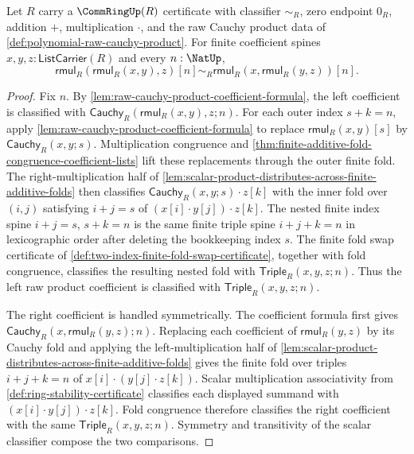 \begin{lemma}
\label{lem:raw-cauchy-product-coefficient-associativity}
Let $R$ carry a $\CommRingUp(R)$ certificate with classifier $\sim_R$, zero endpoint $0_R$, addition $+$, multiplication $\cdot$, and the raw Cauchy product data of \autoref{def:polynomial-raw-cauchy-product}. For finite coefficient spines $x,y,z:\mathsf{ListCarrier}(R)$ and every $n:\NatUp$,
$$
\mathsf{rmul}_R(\mathsf{rmul}_R(x,y),z)[n]\sim_R\mathsf{rmul}_R(x,\mathsf{rmul}_R(y,z))[n].
$$
\end{lemma}
\begin{proof}
Fix $n$. By \autoref{lem:raw-cauchy-product-coefficient-formula}, the left coefficient is classified with $\mathsf{Cauchy}_R(\mathsf{rmul}_R(x,y),z;n)$. For each outer index $s+k=n$, apply \autoref{lem:raw-cauchy-product-coefficient-formula} to replace $\mathsf{rmul}_R(x,y)[s]$ by $\mathsf{Cauchy}_R(x,y;s)$. Multiplication congruence and \autoref{thm:finite-additive-fold-congruence-coefficient-lists} lift these replacements through the outer finite fold. The right-multiplication half of \autoref{lem:scalar-product-distributes-across-finite-additive-folds} then classifies $\mathsf{Cauchy}_R(x,y;s)\cdot z[k]$ with the inner fold over $(i,j)$ satisfying $i+j=s$ of $(x[i]\cdot y[j])\cdot z[k]$. The nested finite index spine $i+j=s$, $s+k=n$ is the same finite triple spine $i+j+k=n$ in lexicographic order after deleting the bookkeeping index $s$. The finite fold swap certificate of \autoref{def:two-index-finite-fold-swap-certificate}, together with fold congruence, classifies the resulting nested fold with $\mathsf{Triple}_R(x,y,z;n)$. Thus the left raw product coefficient is classified with $\mathsf{Triple}_R(x,y,z;n)$.

The right coefficient is handled symmetrically. The coefficient formula first gives $\mathsf{Cauchy}_R(x,\mathsf{rmul}_R(y,z);n)$. Replacing each coefficient of $\mathsf{rmul}_R(y,z)$ by its Cauchy fold and applying the left-multiplication half of \autoref{lem:scalar-product-distributes-across-finite-additive-folds} gives the finite fold over triples $i+j+k=n$ of $x[i]\cdot(y[j]\cdot z[k])$. Scalar multiplication associativity from \autoref{def:ring-stability-certificate} classifies each displayed summand with $(x[i]\cdot y[j])\cdot z[k]$. Fold congruence therefore classifies the right coefficient with the same $\mathsf{Triple}_R(x,y,z;n)$. Symmetry and transitivity of the scalar classifier compose the two comparisons.
\end{proof}

